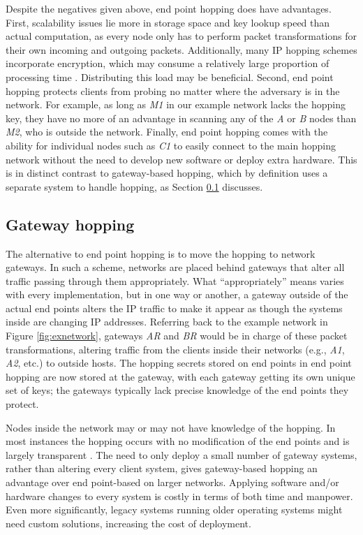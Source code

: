\par Despite the negatives given above, end point hopping does have advantages. First, scalability issues lie more in storage space and key lookup speed than actual computation, as every node only has to perform packet transformations for their own incoming and outgoing packets. Additionally, many \ac{IP} hopping schemes incorporate encryption, which may consume a relatively large proportion of processing time \cite{BBNDYNAT, SandiaDynat}. Distributing this load may be beneficial. Second, end point hopping protects clients from probing no matter where the adversary is in the network. For example, as long as \textit{M1} in our example network lacks the hopping key, they have no more of an advantage in scanning any of the \textit{A} or \textit{B} nodes than \textit{M2}, who is outside the network. Finally, end point hopping comes with the ability for individual nodes such as \textit{C1} to easily connect to the main hopping network without the need to develop new software or deploy extra hardware. This is in distinct contrast to gateway-based hopping, which by definition uses a separate system to handle hopping, as Section \ref{sec:gateway_hopping} discusses.

\subsection{Gateway hopping}
\label{sec:gateway_hopping}
\par The alternative to end point hopping is to move the hopping to network gateways. In such a scheme, networks are placed behind gateways that alter all traffic passing through them appropriately. What ``appropriately'' means varies with every implementation, but in one way or another, a gateway outside of the actual end points alters the IP traffic to make it appear as though the systems inside are changing IP addresses. Referring back to the example network in Figure \ref{fig:exnetwork}, gateways \textit{AR} and \textit{BR} would be in charge of these packet transformations, altering traffic from the clients inside their networks (e.g., \textit{A1}, \textit{A2}, etc.) to outside hosts. The hopping secrets stored on end points in end point hopping are now stored at the gateway, with each gateway getting its own unique set of keys; the gateways typically lack precise knowledge of the end points they protect.

\par Nodes inside the network may or may not have knowledge of the hopping. In most instances the hopping occurs with no modification of the end points and is largely transparent \cite{TAO}. The need to only deploy a small number of gateway systems, rather than altering every client system, gives gateway-based hopping an advantage over end point-based on larger networks. Applying software and/or hardware changes to every system is costly in terms of both time and manpower. Even more significantly, legacy systems running older operating systems might need custom solutions, increasing the cost of deployment.

